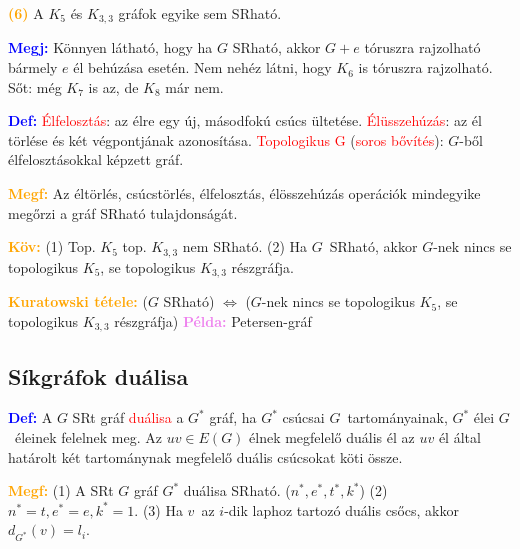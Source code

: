 \documentclass[../szamtud.tex]{subfiles}
\begin{document}
        \textcolor{orange}{\textbf{(6)}} A $K_5$ és $K_{3,3}$ gráfok egyike sem SRható.


        \textcolor{blue}{\textbf{Megj:}} Könnyen látható, hogy ha $G$ SRható, akkor $G + e$ tóruszra rajzolható bármely $e$ él behúzása esetén. Nem nehéz látni, hogy $K_6$ is tóruszra rajzolható. Sőt: még $K_7$ is az, de $K_8$ már nem. 

        \textcolor{blue}{\textbf{Def:}} \textcolor{red}{Élfelosztás}: az élre egy új, másodfokú csúcs ültetése. \textcolor{red}{Élüsszehúzás}: az él törlése és két végpontjának azonosítása. \textcolor{red}{Topologikus G} (\textcolor{red}{soros bővítés}): $G$-ből élfelosztásokkal képzett gráf. 

        \textcolor{orange}{\textbf{Megf:}} Az éltörlés, csúcstörlés, élfelosztás, élösszehúzás operációk mindegyike megőrzi a gráf SRható tulajdonságát. 

        \textcolor{orange}{\textbf{Köv:}} (1) Top. $K_5$ top. $K_{3,3}$ nem SRható. (2) Ha $G$ SRható, akkor $G$-nek nincs se topologikus $K_5$, se topologikus $K_{3,3}$ részgráfja.

        \textcolor{orange}{\textbf{Kuratowski tétele:}} ($G$ SRható) $\Longleftrightarrow$ ($G$-nek nincs se topologikus $K_5$, se topologikus $K_{3,3}$ részgráfja) \textcolor{violet}{\textbf{Példa:}} Petersen-gráf

    \subsection{Síkgráfok duálisa}

        \textcolor{blue}{\textbf{Def:}} A $G$ SRt gráf \textcolor{red}{duálisa} a $G^*$ gráf, ha $G^*$ csúcsai $G$ tartományainak, $G^*$ élei $G$ éleinek felelnek meg. Az $uv \in E(G)$ élnek megfelelő duális él az $uv$ él által határolt két tartománynak megfelelő duális csúcsokat köti össze. 

        \textcolor{orange}{\textbf{Megf:}} (1) A SRt $G$ gráf $G^*$ duálisa SRható. ($n^*, e^*, t^*, k^*$) (2) $n^* = t, e^* = e, k^* = 1$. (3) Ha $v$ az $i$-dik laphoz tartozó duális csőcs, akkor $d_{G^*}(v) = l_i$.
\end{document}
